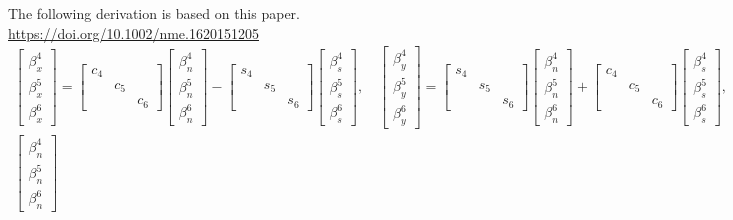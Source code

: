 \documentclass[a4paper,10pt,fleqn]{article}
\begin{document}
\small\pagestyle{empty}
The following derivation is based on this paper. \href{https://doi.org/10.1002/nme.1620151205}{https://doi.org/10.1002/nme.1620151205}
\begin{gather}
\begin{bmatrix}\beta_x^4\\\beta_x^5\\\beta_x^6\end{bmatrix}=
\begin{bmatrix}
c_4&&\\
&c_5&\\
&&c_6
\end{bmatrix}\begin{bmatrix}
\beta_n^4\\\beta_n^5\\\beta_n^6
\end{bmatrix}-\begin{bmatrix}
s_4&&\\
&s_5&\\
&&s_6
\end{bmatrix}\begin{bmatrix}
\beta_s^4\\\beta_s^5\\\beta_s^6
\end{bmatrix},\quad
\begin{bmatrix}\beta_y^4\\\beta_y^5\\\beta_y^6\end{bmatrix}=\begin{bmatrix}
s_4&&\\
&s_5&\\
&&s_6
\end{bmatrix}\begin{bmatrix}
\beta_n^4\\\beta_n^5\\\beta_n^6
\end{bmatrix}+\begin{bmatrix}
c_4&&\\
&c_5&\\
&&c_6
\end{bmatrix}\begin{bmatrix}
\beta_s^4\\\beta_s^5\\\beta_s^6
\end{bmatrix},\\
\begin{bmatrix}
\beta_n^4\\\beta_n^5\\\beta_n^6

\end{bmatrix}
\end{gather}
\end{document}
